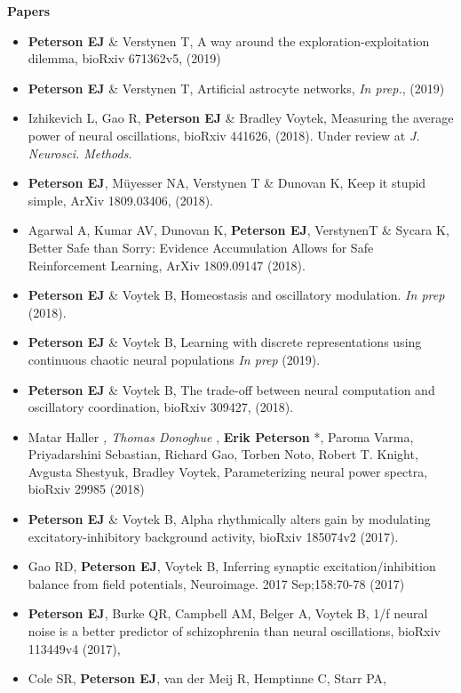 \textbf{Papers}

\begin{itemize}
\item
  \textbf{Peterson EJ} \& Verstynen T, A way around the
  exploration-exploitation dilemma, bioRxiv 671362v5, (2019)
\item
  \textbf{Peterson EJ} \& Verstynen T, Artificial astrocyte networks,
  \emph{In prep.}, (2019)
\item
  Izhikevich L, Gao R, \textbf{Peterson EJ} \& Bradley Voytek, Measuring
  the average power of neural oscillations, bioRxiv 441626, (2018).
  Under review at \emph{J. Neurosci. Methods}.
\item
  \textbf{Peterson EJ}, Müyesser NA, Verstynen T \& Dunovan K, Keep it
  stupid simple, ArXiv 1809.03406, (2018).
\item
  Agarwal A, Kumar AV, Dunovan K, \textbf{Peterson EJ}, VerstynenT \&
  Sycara K, Better Safe than Sorry: Evidence Accumulation Allows for
  Safe Reinforcement Learning, ArXiv 1809.09147 (2018).
\item
  \textbf{Peterson EJ} \& Voytek B, Homeostasis and oscillatory
  modulation. \emph{In prep} (2018).
\item
  \textbf{Peterson EJ} \& Voytek B, Learning with discrete
  representations using continuous chaotic neural populations \emph{In
  prep} (2019).
\item
  \textbf{Peterson EJ} \& Voytek B, The trade-off between neural
  computation and oscillatory coordination, bioRxiv 309427, (2018).
\item
  Matar Haller \emph{, Thomas Donoghue }, \textbf{Erik Peterson} *,
  Paroma Varma, Priyadarshini Sebastian, Richard Gao, Torben Noto,
  Robert T. Knight, Avgusta Shestyuk, Bradley Voytek, Parameterizing
  neural power spectra, bioRxiv 29985 (2018)
\item
  \textbf{Peterson EJ} \& Voytek B, Alpha rhythmically alters gain by
  modulating excitatory-inhibitory background activity, bioRxiv 185074v2
  (2017).
\item
  Gao RD, \textbf{Peterson EJ}, Voytek B, Inferring synaptic
  excitation/inhibition balance from field potentials, Neuroimage. 2017
  Sep;158:70-78 (2017)
\item
  \textbf{Peterson EJ}, Burke QR, Campbell AM, Belger A, Voytek B, 1/f
  neural noise is a better predictor of schizophrenia than neural
  oscillations, bioRxiv 113449v4 (2017),
\item
  Cole SR, \textbf{Peterson EJ}, van der Meij R, Hemptinne C, Starr PA,

\end{itemize}

